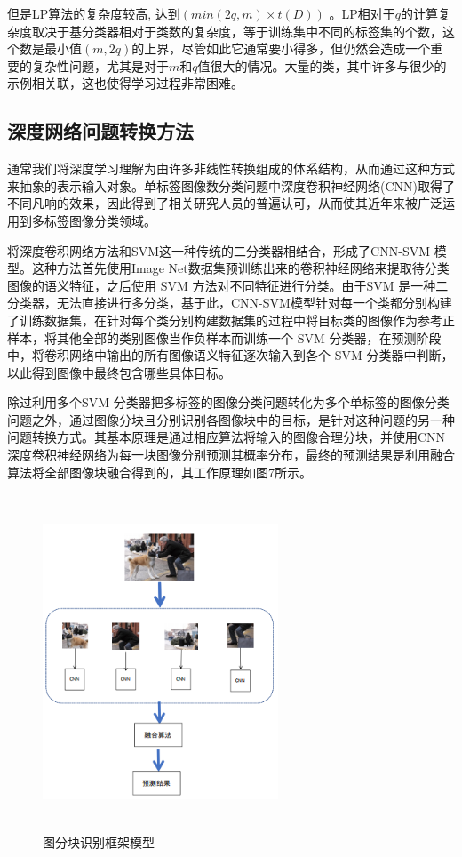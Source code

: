 但是LP算法的复杂度较高, 达到$(min(2q, m)\times t(D))$ 。LP相对于$q$的计算复杂度取决于基分类器相对于类数的复杂度，等于训练集中不同的标签集的个数，这个数是最小值$(m,2q)$的上界，尽管如此它通常要小得多，但仍然会造成一个重要的复杂性问题，尤其是对于$m$和$q$值很大的情况。大量的类，其中许多与很少的示例相关联，这也使得学习过程非常困难。

\subsection{深度网络问题转换方法}

通常我们将深度学习理解为由许多非线性转换组成的体系结构，从而通过这种方式来抽象的表示输入对象。单标签图像数分类问题中深度卷积神经网络(CNN)取得了不同凡响的效果，因此得到了相关研究人员的普遍认可，从而使其近年来被广泛运用到多标签图像分类领域。

将深度卷积网络方法和SVM这一种传统的二分类器相结合，形成了CNN-SVM 模型。这种方法首先使用Image Net数据集预训练出来的卷积神经网络来提取待分类图像的语义特征，之后使用 SVM 方法对不同特征进行分类。由于SVM 是一种二分类器，无法直接进行多分类，基于此，CNN-SVM模型针对每一个类都分别构建了训练数据集，在针对每个类分别构建数据集的过程中将目标类的图像作为参考正样本，将其他全部的类别图像当作负样本而训练一个 SVM 分类器，在预测阶段中，将卷积网络中输出的所有图像语义特征逐次输入到各个 SVM 分类器中判断，以此得到图像中最终包含哪些具体目标。

除过利用多个SVM 分类器把多标签的图像分类问题转化为多个单标签的图像分类问题之外，通过图像分块且分别识别各图像块中的目标，是针对这种问题的另一种问题转换方式。其基本原理是通过相应算法将输入的图像合理分块，并使用CNN深度卷积神经网络为每一块图像分别预测其概率分布，最终的预测结果是利用融合算法将全部图像块融合得到的，其工作原理如图7所示。

\begin{figure}[htbp!]
	\centering
	\includegraphics[width=7cm,height=10cm]{figures/p2-8.png}
	\caption{图分块识别框架模型}\label{fig:p2-8}
	\vspace{-1em}
\end{figure}

